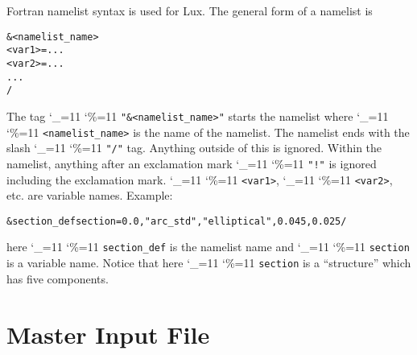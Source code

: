 \documentclass[11pt]{article}
\newcommand{\lux}{Lux\xspace}
\newcommand\ttcmd{\begingroup\catcode`\_=11 \catcode`\%=11 \dottcmd}
\newcommand\dottcmd[1]{\texttt{#1}\endgroup}
\newcommand{\vn}{\ttcmd}
\newenvironment{example}
  {\vspace{\ExBeg} \begin{alltt}}
  {\end{alltt} \vspace{\ExEnd}}
\newlength{\ExBeg}
\newlength{\ExEnd}
\begin{document}
Fortran namelist syntax is used for \lux. The general form
of a namelist is
\begin{example}
  &<namelist_name>
    <var1> = ...
    <var2> = ...
    ...
  /
\end{example}
The tag \vn{"\&<namelist_name>"} starts the namelist where
\vn{<namelist_name>} is the name of the namelist. The namelist ends
with the slash \vn{"/"} tag. Anything outside of this is
ignored. Within the namelist, anything after an exclamation mark
\vn{"!"} is ignored including the exclamation mark. \vn{<var1>},
\vn{<var2>}, etc. are variable names. Example:
\begin{example}
  &section_def section =   0.0, "arc_std", "elliptical", 0.045, 0.025 /
\end{example}
here \vn{section_def} is the namelist name and \vn{section} is a variable
name.  Notice that here \vn{section} is a ``structure'' which has five
components.

\section{Master Input File} 
\label{s:master.file}
\end{document}
